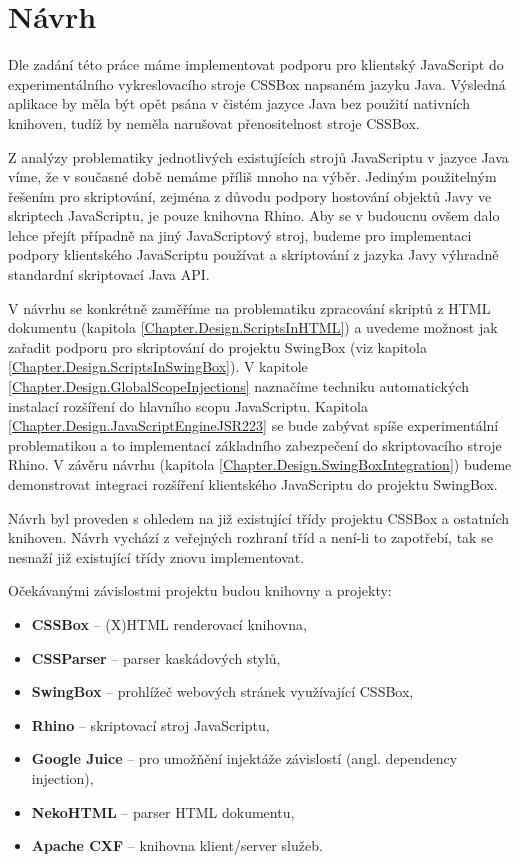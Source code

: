 \chapter{Návrh}
\label{Chapter.Design}

Dle zadání této práce máme implementovat podporu pro klientský JavaScript do experimentálního vykreslovacího stroje CSSBox napsaném jazyku Java. Výsledná aplikace by měla být opět psána v čistém jazyce Java bez použití nativních knihoven, tudíž by neměla narušovat přenositelnost stroje CSSBox.

Z  analýzy problematiky jednotlivých existujících strojů JavaScriptu v jazyce Java víme, že v současné době nemáme příliš mnoho na výběr. Jediným použitelným řešením pro skriptování, zejména z důvodu podpory hostování objektů Javy ve skriptech JavaScriptu, je pouze knihovna Rhino. Aby se v budoucnu ovšem dalo lehce přejít případně na jiný JavaScriptový stroj, budeme pro implementaci podpory klientského JavaScriptu používat a skriptování z jazyka Javy výhradně standardní skriptovací Java API.

V návrhu se konkrétně zaměříme na problematiku zpracování skriptů z HTML dokumentu (kapitola \ref{Chapter.Design.ScriptsInHTML}) a uvedeme možnost jak zařadit podporu pro skriptování do projektu SwingBox (viz kapitola \ref{Chapter.Design.ScriptsInSwingBox}). V kapitole \ref{Chapter.Design.GlobalScopeInjections} naznačíme techniku automatických instalací rozšíření do hlavního scopu JavaScriptu. Kapitola \ref{Chapter.Design.JavaScriptEngineJSR223} se bude zabývat spíše experimentální problematikou a to implementací základního zabezpečení do skriptovacího stroje Rhino. V závěru návrhu (kapitola \ref{Chapter.Design.SwingBoxIntegration}) budeme demonstrovat integraci rozšíření klientského JavaScriptu do projektu SwingBox.

Návrh byl proveden s ohledem na již existující třídy projektu CSSBox a ostatních knihoven. Návrh vychází z veřejných rozhraní tříd a není-li to zapotřebí, tak se nesnaží již existující třídy znovu implementovat. 

\bigskip \noindent Očekávanými závislostmi projektu budou knihovny a projekty:

\begin{itemize}
  \item \textbf{CSSBox} -- (X)HTML renderovací knihovna,
  \item \textbf{CSSParser} -- parser kaskádových stylů,
  \item \textbf{SwingBox} -- prohlížeč webových stránek využívající CSSBox,
  \item \textbf{Rhino} -- skriptovací stroj JavaScriptu,
  \item \textbf{Google Juice} -- pro umožňění injektáže závislostí (angl. dependency injection),  
  \item \textbf{NekoHTML} -- parser HTML dokumentu,
  \item \textbf{Apache CXF} -- knihovna klient/server služeb.
\end{itemize}

